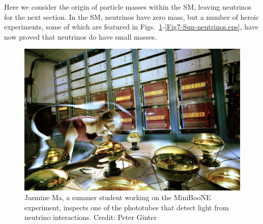 \documentclass[12pt]{iopart}
\begin{document}
Here we consider the origin of particle masses within the SM, leaving neutrinos for the next section. In the SM, neutrinos have zero mass, but a number of heroic experiments, some of which are featured in Figs.~\ref{Fig3-FN0197H.eps}-\ref{Fig7-Sun-neutrinos.eps}, have now proved that neutrinos do have small masses. 
\begin{figure}[htbp]
\centering
 \includegraphics[bb=0 0 360 240, width=5in]{Fig3-FN0197H.eps}
 \caption{Jasmine Ma, a summer student working on the MiniBooNE experiment, inspects one of the phototubes that detect light from neutrino interactions. Credit: Peter Ginter \label{Fig3-FN0197H.eps}}
 \end{figure}
\end{document}
